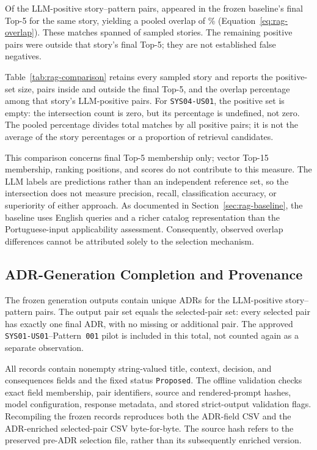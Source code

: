 Of the \StudyApplicableCount{} LLM-positive story--pattern pairs,
\StudyRagOverlapCount{} appeared in the frozen baseline's final Top-5 for
the same story, yielding a pooled overlap of \RqTwoOverlapPercent{}\%
(Equation~\ref{eq:rag-overlap}). These matches spanned
\StudyRagOverlapStoryCount{} of \StudyStoryCount{} sampled stories.
The remaining \StudyRagOutsideCount{} positive pairs were outside that
story's final Top-5; they are not established false negatives.



Table~\ref{tab:rag-comparison} retains every sampled story and reports
the positive-set size, pairs inside and outside the final Top-5, and
the overlap percentage among that story's LLM-positive pairs.
For \texttt{SYS04-US01}, the positive set is empty: the intersection count
is zero, but its percentage is undefined, not zero.
The pooled percentage divides total matches by all positive pairs;
it is not the average of the story percentages or a proportion of
retrieval candidates.

This comparison concerns final Top-5 membership only; vector Top-15
membership, ranking positions, and scores do not contribute to this measure.
The LLM labels are predictions rather than an independent reference set,
so the intersection does not measure precision, recall, classification
accuracy, or superiority of either approach. As documented in
Section~\ref{sec:rag-baseline}, the baseline uses English queries and a
richer catalog representation than the Portuguese-input applicability
assessment. Consequently, observed overlap differences cannot be
attributed solely to the selection mechanism.

\subsection{ADR-Generation Completion and Provenance}
\label{sec:adr-results}

The frozen generation outputs contain \StudyAdrCount{} unique ADRs for the
\StudyApplicableCount{} LLM-positive story--pattern pairs. The output pair
set equals the selected-pair set: every selected pair has exactly one final
ADR, with no missing or additional pair. The approved
\texttt{SYS01-US01}--Pattern~\texttt{001} pilot is included in this total,
not counted again as a separate observation.

All \StudyAdrCount{} records contain nonempty string-valued title, context,
decision, and consequences fields and the fixed status \texttt{Proposed}.
The offline validation checks exact field membership, pair identifiers,
source and rendered-prompt hashes, model configuration, response metadata,
and stored strict-output validation flags. Recompiling the frozen records
reproduces both the ADR-field CSV and the ADR-enriched selected-pair CSV
byte-for-byte. The source hash refers to the preserved pre-ADR selection
file, rather than its subsequently enriched version.

